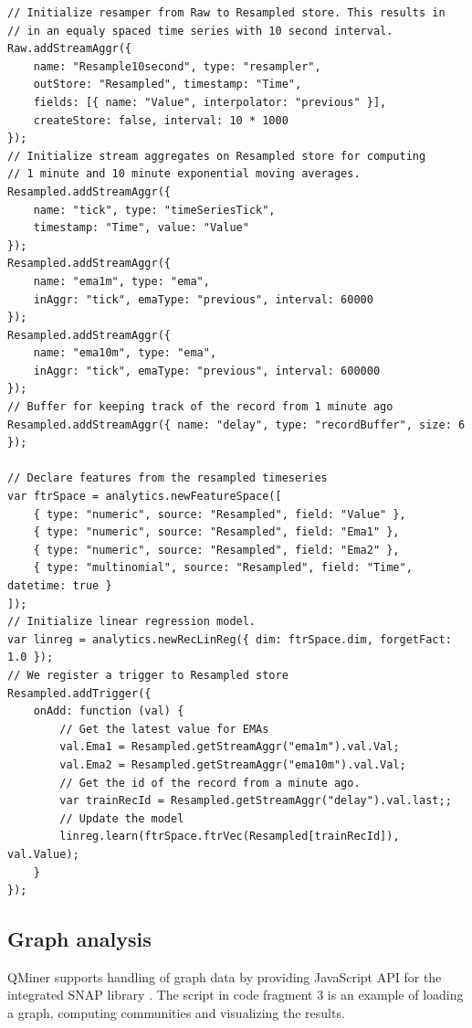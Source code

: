 \documentclass{article} %
\begin{document}
\begin{lstlisting}[caption=Time series processing] 	
// Initialize resamper from Raw to Resampled store. This results in
// in an equaly spaced time series with 10 second interval.
Raw.addStreamAggr({
    name: "Resample10second", type: "resampler",
    outStore: "Resampled", timestamp: "Time",
    fields: [{ name: "Value", interpolator: "previous" }],
    createStore: false, interval: 10 * 1000
});
// Initialize stream aggregates on Resampled store for computing
// 1 minute and 10 minute exponential moving averages.
Resampled.addStreamAggr({
    name: "tick", type: "timeSeriesTick",
    timestamp: "Time", value: "Value"
});
Resampled.addStreamAggr({
    name: "ema1m", type: "ema",
    inAggr: "tick", emaType: "previous", interval: 60000
});
Resampled.addStreamAggr({
    name: "ema10m", type: "ema",
    inAggr: "tick", emaType: "previous", interval: 600000
});
// Buffer for keeping track of the record from 1 minute ago
Resampled.addStreamAggr({ name: "delay", type: "recordBuffer", size: 6 });

// Declare features from the resampled timeseries
var ftrSpace = analytics.newFeatureSpace([
    { type: "numeric", source: "Resampled", field: "Value" },
    { type: "numeric", source: "Resampled", field: "Ema1" },
    { type: "numeric", source: "Resampled", field: "Ema2" },
    { type: "multinomial", source: "Resampled", field: "Time", datetime: true }
]);
// Initialize linear regression model.
var linreg = analytics.newRecLinReg({ dim: ftrSpace.dim, forgetFact: 1.0 });
// We register a trigger to Resampled store
Resampled.addTrigger({
    onAdd: function (val) {
        // Get the latest value for EMAs
        val.Ema1 = Resampled.getStreamAggr("ema1m").val.Val;
        val.Ema2 = Resampled.getStreamAggr("ema10m").val.Val;
        // Get the id of the record from a minute ago.
        var trainRecId = Resampled.getStreamAggr("delay").val.last;;
        // Update the model
        linreg.learn(ftrSpace.ftrVec(Resampled[trainRecId]), val.Value);
    }
});

\end{lstlisting}


\subsection{Graph analysis}
QMiner supports handling of graph data by providing JavaScript API for the integrated SNAP library \cite{snap}. 
The script in code fragment 3 is an example of loading a graph, computing communities and visualizing the results.
\end{document}
